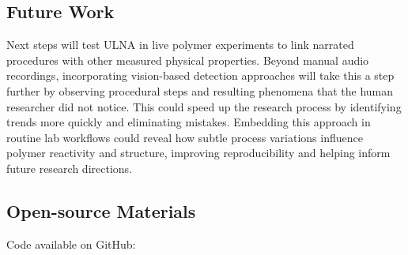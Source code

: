\subsection*{Future Work}
Next steps will test ULNA in live polymer experiments to link narrated procedures with other measured physical properties. Beyond manual audio recordings, incorporating vision-based detection approaches will take this a step further by observing procedural steps and resulting phenomena that the human researcher did not notice. This could speed up the research process by identifying trends more quickly and eliminating mistakes. Embedding this approach in routine lab workflows could reveal how subtle process variations influence polymer reactivity and structure, improving reproducibility and helping inform future research directions.


\subsection*{Open-source Materials}
Code available on GitHub: 



